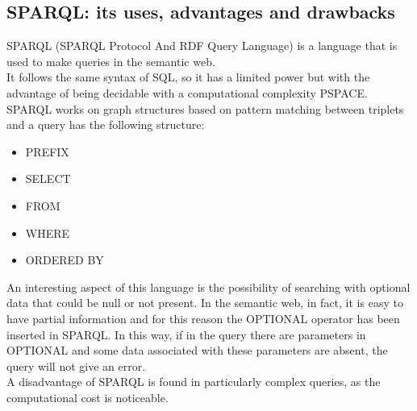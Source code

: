 \subsection{SPARQL: its uses, advantages and drawbacks}
SPARQL (SPARQL Protocol And RDF Query Language) is a language that
is used to make queries in the semantic web.\\
It follows the same syntax of SQL, so it has a limited power but with
the advantage of being decidable with a computational complexity PSPACE.\\
SPARQL works on graph structures based on pattern matching between
triplets and a query has the following structure:
\begin{itemize}
    \item PREFIX
    \item SELECT
    \item FROM
    \item WHERE
    \item ORDERED BY
\end{itemize}
An interesting aspect of this language is the possibility of searching
with optional data that could be null or not present.
In the semantic web, in fact, it is easy to have partial information
and for this reason the OPTIONAL operator has been inserted in SPARQL.
In this way, if in the query there are parameters in OPTIONAL and some
data associated with these parameters are
absent, the query will not give an error.\\
A disadvantage of SPARQL is found in particularly complex queries,
as the computational cost is noticeable.

